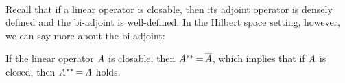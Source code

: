 \documentclass[11pt,twoside]{article}
\begin{document}
\paragraph{} %
Recall that if a linear operator is closable,
then its adjoint operator is densely defined and the bi-adjoint is well-defined.
In the Hilbert space setting,
however,
we can say more about the bi-adjoint:

\begin{theorem}
If the linear operator $\mathit{A}$ is closable,
then $\mathit{A}^{**} {\,=\,} \overline{\mathit{A}}$,
which implies that
if $\mathit{A}$ is closed,
then $\mathit{A}^{**} {\,=\,} \mathit{A}$ holds.
\end{theorem}

\end{document}
